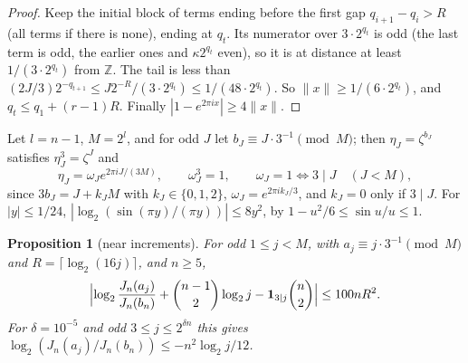 \documentclass[11pt,a4paper]{article}
\newtheorem{proposition}[theorem]{Proposition}
\theoremstyle{definition}
\newcommand{\Z}{\mathbb{Z}}
\begin{document}
\begin{proof}
Keep the initial block of terms ending before the first gap $q_{i+1}-q_i>R$
(all terms if there is none), ending at $q_t$. Its numerator over $3\cdot
2^{q_t}$ is odd (the last term is odd, the earlier ones and $\kappa2^{q_t}$
even), so it is at distance at least $1/(3\cdot2^{q_t})$ from $\Z$. The tail
is less than $(2J/3)2^{-q_{t+1}}\le J2^{-R}/(3\cdot2^{q_t})\le
1/(48\cdot2^{q_t})$. So $\|x\|\ge1/(6\cdot2^{q_t})$, and $q_t\le q_1+(r-1)R$.
Finally $|1-e^{2\pi ix}|\ge4\|x\|$.
\end{proof}

Let $l=n-1$, $M=2^l$, and for odd $J$ let $b_J\equiv J\cdot3^{-1}\pmod M$; then
$\eta_J=\zeta^{b_J}$ satisfies $\eta_J^3=\zeta^J$ and
\begin{equation}\label{eq:cuberoot}
 \eta_J=\omega_Je^{2\pi iJ/(3M)},\qquad\omega_J^3=1,\qquad
 \omega_J=1\iff3\mid J\quad(J<M),
\end{equation}
since $3b_J=J+k_JM$ with $k_J\in\{0,1,2\}$, $\omega_J=e^{2\pi ik_J/3}$, and
$k_J=0$ only if $3\mid J$. For $|y|\le1/24$,
$|\log_2(\sin(\pi y)/(\pi y))|\le8y^2$, by $1-u^2/6\le\sin u/u\le1$.

\begin{proposition}[near increments]\label{prop:near}
For odd $1\le j<M$, with $a_j\equiv j\cdot3^{-1}\pmod M$ and
$R=\lceil\log_2(16j)\rceil$, and $n\ge5$,
\begin{equation}\label{eq:near}
 \Bigl|\log_2\frac{J_n(a_j)}{J_n(b_n)}+\binom{n-1}2\log_2j
 -\mathbf1_{3\mid j}\binom n2\Bigr|\le100nR^2 .
\end{equation}
For $\delta=10^{-5}$ and odd $3\le j\le2^{\delta n}$ this gives
$\log_2(J_n(a_j)/J_n(b_n))\le-n^2\log_2j/12$.
\end{proposition}
\end{document}
